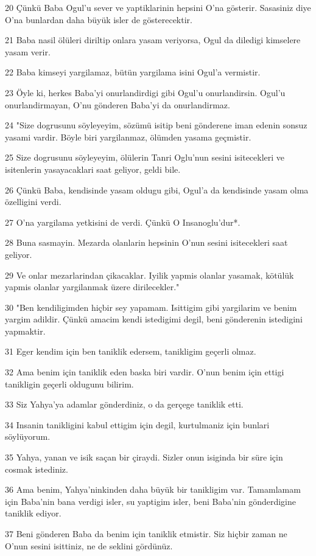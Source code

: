 \par 20 Çünkü Baba Ogul'u sever ve yaptiklarinin hepsini O'na gösterir. Sasasiniz diye O'na bunlardan daha büyük isler de gösterecektir.
\par 21 Baba nasil ölüleri diriltip onlara yasam veriyorsa, Ogul da diledigi kimselere yasam verir.
\par 22 Baba kimseyi yargilamaz, bütün yargilama isini Ogul'a vermistir.
\par 23 Öyle ki, herkes Baba'yi onurlandirdigi gibi Ogul'u onurlandirsin. Ogul'u onurlandirmayan, O'nu gönderen Baba'yi da onurlandirmaz.
\par 24 "Size dogrusunu söyleyeyim, sözümü isitip beni gönderene iman edenin sonsuz yasami vardir. Böyle biri yargilanmaz, ölümden yasama geçmistir.
\par 25 Size dogrusunu söyleyeyim, ölülerin Tanri Oglu'nun sesini isitecekleri ve isitenlerin yasayacaklari saat geliyor, geldi bile.
\par 26 Çünkü Baba, kendisinde yasam oldugu gibi, Ogul'a da kendisinde yasam olma özelligini verdi.
\par 27 O'na yargilama yetkisini de verdi. Çünkü O Insanoglu'dur*.
\par 28 Buna sasmayin. Mezarda olanlarin hepsinin O'nun sesini isitecekleri saat geliyor.
\par 29 Ve onlar mezarlarindan çikacaklar. Iyilik yapmis olanlar yasamak, kötülük yapmis olanlar yargilanmak üzere dirilecekler."
\par 30 "Ben kendiligimden hiçbir sey yapamam. Isittigim gibi yargilarim ve benim yargim adildir. Çünkü amacim kendi istedigimi degil, beni gönderenin istedigini yapmaktir.
\par 31 Eger kendim için ben taniklik edersem, tanikligim geçerli olmaz.
\par 32 Ama benim için taniklik eden baska biri vardir. O'nun benim için ettigi tanikligin geçerli oldugunu bilirim.
\par 33 Siz Yahya'ya adamlar gönderdiniz, o da gerçege taniklik etti.
\par 34 Insanin tanikligini kabul ettigim için degil, kurtulmaniz için bunlari söylüyorum.
\par 35 Yahya, yanan ve isik saçan bir çiraydi. Sizler onun isiginda bir süre için cosmak istediniz.
\par 36 Ama benim, Yahya'ninkinden daha büyük bir tanikligim var. Tamamlamam için Baba'nin bana verdigi isler, su yaptigim isler, beni Baba'nin gönderdigine taniklik ediyor.
\par 37 Beni gönderen Baba da benim için taniklik etmistir. Siz hiçbir zaman ne O'nun sesini isittiniz, ne de seklini gördünüz.
